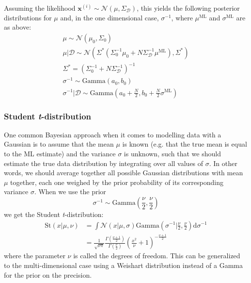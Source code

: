 \documentclass[a4paper]{article}
\begin{document}
Assuming the likelihood $\mathbf{x}^{(i)}\sim\mathcal{N}(\mu,\Sigma_\mathcal{D})$, this yields the following posterior distributions for $\mu$ and, in the one dimensional case, $\sigma^{-1}$, where $\mu^\textrm{ML}$ and $\sigma^\textrm{ML}$ are as above:
\begin{gather*}
\mu \sim \mathcal{N}(\mu_0,\Sigma_0) \\
\mu|\mathcal{D} \sim \mathcal{N}\left(\Sigma^*(\Sigma_0^{-1}\mu_0 + N\Sigma_\mathcal{D}^{-1}\mu^\textrm{ML}),\Sigma^*\right) \\
\Sigma^* = (\Sigma_0^{-1} + N\Sigma_\mathcal{D}^{-1})^{-1} \\
\sigma^{-1} \sim \textrm{Gamma}\left(a_0,b_0\right) \\
\sigma^{-1}|\mathcal{D} \sim \textrm{Gamma}\left(a_0 + \frac{N}{2},b_0 + \frac{N}{2}\sigma^\textrm{ML}\right)
\end{gather*}

\subsubsection{Student \emph{t}-distribution}
One common Bayesian approach when it comes to modelling data with a Gaussian is to assume that the mean $\mu$ is known (e.g. that the true mean is equal to the ML estimate) and the variance $\sigma$ is unknown, such that we should estimate the true data distribution by integrating over all values of $\sigma$. In other words, we should average together all possible Gaussian distributions with mean $\mu$ together, each one weighed by the prior probability of its corresponding variance $\sigma$. When we use the prior
\[\sigma^{-1} \sim \textrm{Gamma}\left(\frac{\nu}{2},\frac{\nu}{2}\right)\]
we get the Student \emph{t}-distribution:
\begin{align*}
\textrm{St}(x|\mu,\nu) &= \int \mathcal{N}(x|\mu,\sigma) \textrm{Gamma}\left(\sigma^{-1}|\frac{\nu}{2},\frac{\nu}{2}\right) \textrm{d}\sigma^{-1} \\
&= \frac{1}{\sqrt{\nu\pi}}\frac{\Gamma(\frac{\nu+1}{2})}{\Gamma(\frac{\nu}{2})}\left(\frac{x^2}{\nu} + 1\right)^{-\frac{\nu + 1}{2}}
\end{align*}
where the parameter $\nu$ is called the degrees of freedom. This can be generalized to the multi-dimensional case using a Weishart distribution instead of a Gamma for the prior on the precision.
\end{document}
